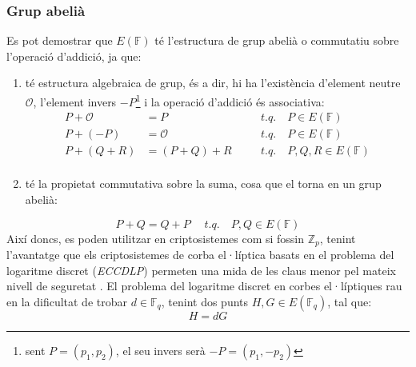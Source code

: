 \documentclass{article}
\begin{document}
\subsubsection{Grup abelià}
Es pot demostrar que $E(\mathbb{F})$ té l'estructura de grup abelià o commutatiu sobre l'operació d'addició, ja que:
\begin{enumerate}
	\item té estructura algebraica de grup, és a dir, hi ha l'existència d'element neutre $\mathcal{O}$, l'element invers $-P$\footnote{sent $P=(p_1, p_2)$, el seu invers serà $-P = (p_1, -p_2)$} i la operació d'addició és associativa:
	\begin{equation*}
		\begin{aligned}
			P + \mathcal{O} &= P & \quad & t.q. \quad P \in E(\mathbb{F})\\
			P + (-P) &= \mathcal{O} & \quad & t.q. \quad P \in E(\mathbb{F})\\
			P + (Q + R) &= (P + Q) + R & \quad & t.q. \quad P, Q, R \in E(\mathbb{F})\\
		\end{aligned}
	\end{equation*}
	\item té la propietat commutativa sobre la suma, cosa que el torna en un grup abelià:
\end{enumerate}
\[ P + Q = Q + P  \quad \; t.q. \quad P, Q \in E(\mathbb{F}) \]
Així doncs, es poden utilitzar en criptosistemes com si fossin $\mathbb{Z}_p$, tenint l'avantatge que els criptosistemes de corba el·líptica basats en el problema del logaritme discret (\textit{ECCDLP}) permeten una mida de les claus menor pel mateix nivell de seguretat \cite{nist-ecc}. El problema del logaritme discret en corbes el·líptiques rau en la dificultat de trobar $d \in \mathbb{F}_q$, tenint dos punts $H, G \in E(\mathbb{F}_q)$, tal que:
\[H = dG\]
\end{document}
